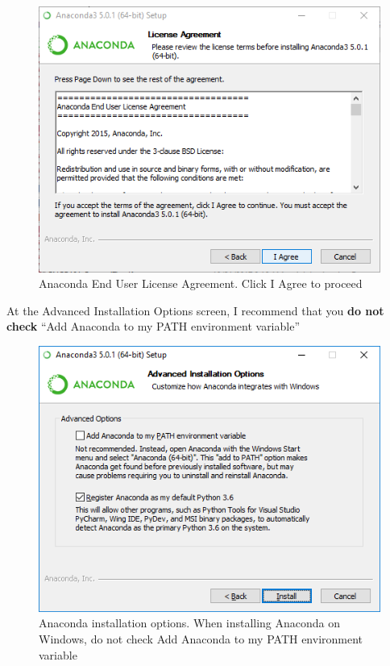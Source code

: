 \documentclass{book}
\makeatletter
\def\maxwidth{\ifdim\Gin@nat@width>\linewidth\linewidth
    \else\Gin@nat@width\fi}
\let\Oldincludegraphics\includegraphics
\renewcommand{\includegraphics}[1]{\Oldincludegraphics[width=.8\maxwidth]{#1}}
\makeatother
\begin{document}
\begin{figure}
\centering
\includegraphics{images/anaconda_agree_to_license.png}
\caption{Anaconda End User License Agreement. Click I Agree to proceed}
\end{figure}

At the Advanced Installation Options screen, I recommend that you
\textbf{do not check} ``Add Anaconda to my PATH environment variable''

\begin{figure}
\centering
\includegraphics{images/anaconda_path2.png}
\caption{Anaconda installation options. When installing Anaconda on
Windows, do not check Add Anaconda to my PATH environment variable}
\end{figure}
    
\end{document}
